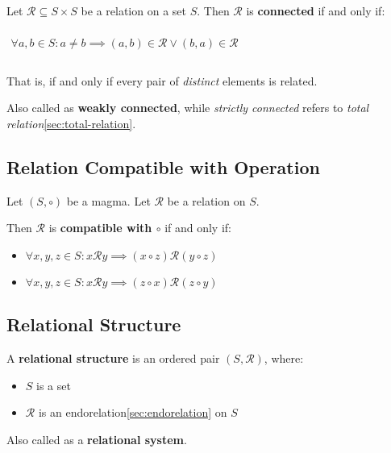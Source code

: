 Let $\mathcal{R} \subseteq S \times S$ be a relation on a set
$S$. Then $\mathcal{R}$ is \textbf{connected} if and only if:

\begin{math}
  \begin{array}{c}
    \\
    \forall a, b \in S: a \neq b \implies (a, b) \in \mathcal{R} \lor (b,a) \in \mathcal{R} \\
    \\
  \end{array}
\end{math}


That is, if and only if every pair of \textit{distinct} elements is
related.


Also called as \textbf{weakly connected}, while \textit{strictly
  connected} refers to \textit{total
  relation}\ref{sec:total-relation}.


\subsection{Relation Compatible with Operation}
\label{sec:compatibility}

Let $(S, \circ)$ be a magma. Let $\mathcal{R}$ be a relation on $S$.

Then $\mathcal{R}$ is \textbf{compatible with $\circ$} if and only if:

\begin{itemize}
\item $\forall x, y, z \in S: x \mathcal{R} y \implies (x \circ z) \mathcal{R} (y \circ z)$
\item $\forall x, y, z \in S: x \mathcal{R} y \implies (z \circ x) \mathcal{R} (z \circ y)$
\end{itemize}


\subsection{Relational Structure}
\label{sec:relational-structure}

A \textbf{relational structure} is an ordered pair $(S, \mathcal{R})$,
where:

\begin{itemize}
\item $S$ is a set
\item $\mathcal{R}$ is an endorelation\ref{sec:endorelation} on $S$
\end{itemize}

Also called as a \textbf{relational system}.



